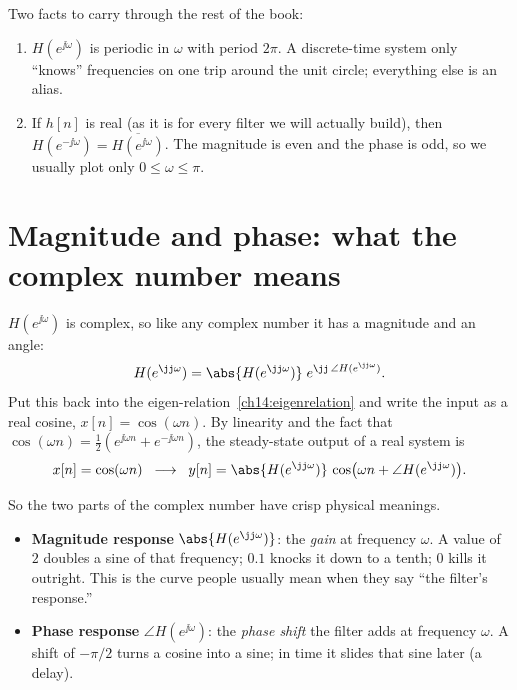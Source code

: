 \begin{focusbox}
Two facts to carry through the rest of the book:
\begin{enumerate}
  \item $H(e^{\jj\omega})$ is periodic in $\omega$ with period $2\pi$. A
  discrete-time system only ``knows'' frequencies on one trip around the unit
  circle; everything else is an alias.
  \item If $h[n]$ is real (as it is for every filter we will actually build),
  then $H(e^{-\jj\omega}) = \overline{H(e^{\jj\omega})}$. The magnitude is even
  and the phase is odd, so we usually plot only $0 \le \omega \le \pi$.
\end{enumerate}
\end{focusbox}

\section{Magnitude and phase: what the complex number means}
\label{ch14:magphase}

$H(e^{\jj\omega})$ is complex, so like any complex number it has a magnitude and
an angle:
\[
  H(e^{\jj\omega}) = \abs{H(e^{\jj\omega})}\; e^{\jj\,\angle H(e^{\jj\omega})}.
\]
Put this back into the eigen-relation~\eqref{ch14:eigenrelation} and write the
input as a real cosine, $x[n] = \cos(\omega n)$. By linearity and the fact that
$\cos(\omega n) = \tfrac12(e^{\jj\omega n} + e^{-\jj\omega n})$, the steady-state
output of a real system is
\begin{equation}
  x[n] = \cos(\omega n) \;\;\longrightarrow\;\;
  y[n] = \abs{H(e^{\jj\omega})}\,\cos\!\big(\omega n + \angle H(e^{\jj\omega})\big).
  \label{ch14:cosinout}
\end{equation}

So the two parts of the complex number have crisp physical meanings.

\begin{itemize}
  \item \textbf{Magnitude response} $\abs{H(e^{\jj\omega})}$: the \emph{gain} at
  frequency $\omega$. A value of $2$ doubles a sine of that frequency; $0.1$
  knocks it down to a tenth; $0$ kills it outright. This is the curve people
  usually mean when they say ``the filter's response.''
  \item \textbf{Phase response} $\angle H(e^{\jj\omega})$: the \emph{phase shift}
  the filter adds at frequency $\omega$. A shift of $-\pi/2$ turns a cosine into
  a sine; in time it slides that sine later (a delay).
\end{itemize}

